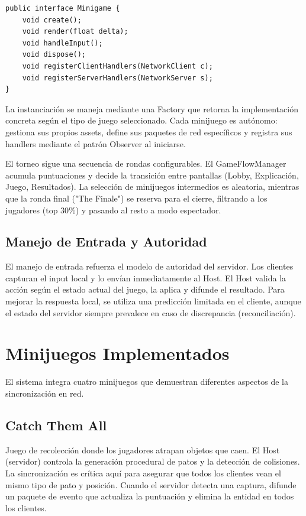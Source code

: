 \documentclass[conference]{IEEEtran}
\begin{document}
\begin{lstlisting}[caption={Interfaz Minigame.},label={lst:minigame}]
public interface Minigame {
    void create();
    void render(float delta);
    void handleInput();
    void dispose();
    void registerClientHandlers(NetworkClient c);
    void registerServerHandlers(NetworkServer s);
}
\end{lstlisting}

La instanciación se maneja mediante una Factory que retorna la implementación concreta según el tipo de juego seleccionado. Cada minijuego es autónomo: gestiona sus propios assets, define sus paquetes de red específicos y registra sus handlers mediante el patrón Observer al iniciarse.

El torneo sigue una secuencia de rondas configurables. El GameFlowManager acumula puntuaciones y decide la transición entre pantallas (Lobby, Explicación, Juego, Resultados). La selección de minijuegos intermedios es aleatoria, mientras que la ronda final ("The Finale") se reserva para el cierre, filtrando a los jugadores (top 30\%) y pasando al resto a modo espectador.

\subsection{Manejo de Entrada y Autoridad}

El manejo de entrada refuerza el modelo de autoridad del servidor. Los clientes capturan el input local y lo envían inmediatamente al Host. El Host valida la acción según el estado actual del juego, la aplica y difunde el resultado. Para mejorar la respuesta local, se utiliza una predicción limitada en el cliente, aunque el estado del servidor siempre prevalece en caso de discrepancia (reconciliación).

\section{Minijuegos Implementados}

El sistema integra cuatro minijuegos que demuestran diferentes aspectos de la sincronización en red.

\subsection{Catch Them All}
Juego de recolección donde los jugadores atrapan objetos que caen. El Host (servidor) controla la generación procedural de patos y la detección de colisiones. La sincronización es crítica aquí para asegurar que todos los clientes vean el mismo tipo de pato y posición. Cuando el servidor detecta una captura, difunde un paquete de evento que actualiza la puntuación y elimina la entidad en todos los clientes.
\end{document}
